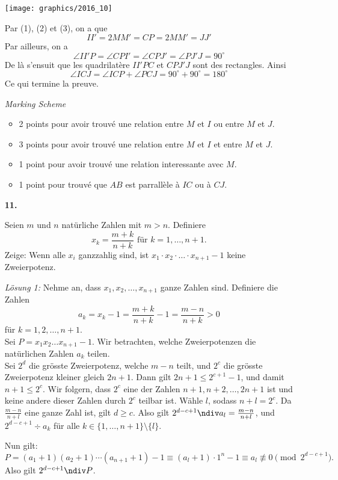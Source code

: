 \documentclass[language=german,style=solution]{smo}
\begin{document}
\begin{enumerate}
\texttt{[image: graphics/2016\_10]}

Par (1), (2) et (3), on a que 
\[
II'=2MM'=CP=2MM'=JJ'
\]
Par ailleurs, on a 
\[
\angle II'P=\angle CPI'=\angle CPJ'=\angle PJ'J=90^{\circ}
\]
De là s'ensuit que les quadrilatère $II'PC$ et $CPJ'J$ sont des rectangles. Ainsi
\[
\angle ICJ=\angle ICP+\angle PCJ=90^{\circ}+90^{\circ}=180^{\circ}
\]
Ce qui termine la preuve.

\textit{Marking Scheme}
\begin{itemize}
	\item 2 points pour avoir trouvé une relation entre $M$ et $I$ ou entre $M$ et $J$.
	\item 3 points pour avoir trouvé une relation entre $M$ et $I$ et entre $M$ et $J$.
	\item 1 point pour avoir trouvé une relation interessante avec $M$.
	\item 1 point pour trouvé que $AB$ est parrallèle à $IC$ ou à $CJ$.
\end{itemize}


\newpage

\item[\textbf{11.}] %

Seien $m$ und $n$ natürliche Zahlen mit $m>n$. Definiere
\[
x_k = \frac{m+k}{n+k}\text{ für }k=1, \ldots, n+1.
\]
Zeige: Wenn alle $x_i$ ganzzahlig sind, ist $x_1\cdot x_2 \cdot \ldots \cdot x_{n+1} - 1$
keine Zweierpotenz.

\textit{Lösung 1:}
Nehme an, dass $x_1, x_2, \ldots ,x_{n+1}$ ganze Zahlen sind. Definiere die Zahlen 
\[
a_k=x_k -1= \frac{m+k}{n+k}-1= \frac{m-n}{n+k}>0
\]
für $k=1,2,\ldots ,n+1$.\\
Sei $P=x_1x_2\ldots x_{n+1}-1$. Wir betrachten, welche  Zweierpotenzen die natürlichen Zahlen $a_k$ teilen. \\
Sei $2^d$ die grösste Zweierpotenz, welche $m-n$ teilt, und $2^c$ die grösste Zweierpotenz kleiner  gleich $2n+1$. Dann gilt $2n+1\leq2^{c+1}-1$, und damit $n+1\leq2^c$. Wir folgern, dass  $2^c$ eine der Zahlen $n+1, n+2, \ldots ,2n+1$ ist und keine andere dieser Zahlen durch $2^c$ teilbar ist. Wähle $l$, sodass $n+l=2^c$. Da $\frac{m-n}{n+l}$ eine ganze Zahl ist, gilt $d\geq c$. Also gilt $2^{d-c+1}\ndiv a_l=\frac{m-n}{n+l}$, und $2^{d-c+1} \div a_k$ für alle $k \in \{1,\ldots,n+1\}\setminus \{l\}$.

Nun gilt:
\[
P=(a_1+1)(a_2+1)\cdots(a_{n+1}+1)-1\equiv(a_l+1)\cdot1^n-1\equiv a_l\nequiv 0 \pmod{2^{d-c+1}}.
\]
Also gilt $2^{d-c+1}\ndiv P$.


\end{enumerate}
\end{document}
